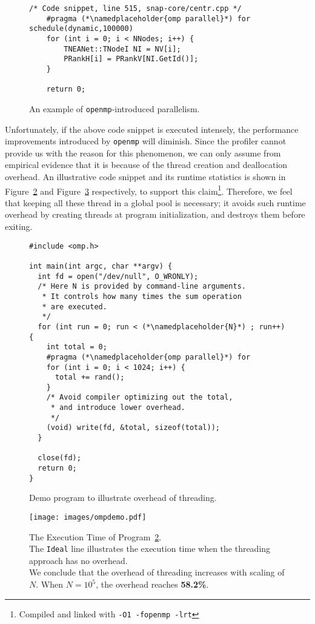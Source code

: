\begin{figure}[ht]
    \centering
\begin{lstlisting}[frame=tlbr]
    /* Code snippet, line 515, snap-core/centr.cpp */
    #pragma (*\namedplaceholder{omp parallel}*) for schedule(dynamic,100000)
    for (int i = 0; i < NNodes; i++) {
        TNEANet::TNodeI NI = NV[i];
        PRankH[i] = PRankV[NI.GetId()];
    }

    return 0;
\end{lstlisting}
    \caption{An example of \texttt{openmp}-introduced parallelism.}
    \label{code:openmp}
\end{figure}

\par Unfortunately, if the above code snippet is executed intensely, the 
performance improvements introduced by \texttt{openmp} will diminish. Since 
the profiler cannot provide us with the reason for this phenomenon, we can
only assume from empirical evidence that it is because of the thread creation 
and deallocation overhead. An illustrative code snippet and its runtime
statistics is shown in Figure~\ref{code:ompdemo} and Figure~\ref{fig:ompdemo} respectively,
to support this claim\footnote{Compiled and linked with \texttt{-O1 -fopenmp -lrt}}.
Therefore, we feel that keeping all these thread in a global pool is necessary;
it avoids such runtime overhead by creating threads at program initialization,
and destroys them before exiting.

\begin{figure}[ht]
    \centering
\begin{lstlisting}[frame=tlbr]
#include <omp.h>

int main(int argc, char **argv) {
  int fd = open("/dev/null", O_WRONLY);
  /* Here N is provided by command-line arguments. 
   * It controls how many times the sum operation
   * are executed.
   */
  for (int run = 0; run < (*\namedplaceholder{N}*) ; run++) {
    int total = 0;
    #pragma (*\namedplaceholder{omp parallel}*) for
    for (int i = 0; i < 1024; i++) {
      total += rand();
    }
    /* Avoid compiler optimizing out the total,
     * and introduce lower overhead.
     */
    (void) write(fd, &total, sizeof(total));
  }

  close(fd);
  return 0;
}
\end{lstlisting}
    \caption{Demo program to illustrate overhead of threading.}
    \label{code:ompdemo}
\end{figure}

\begin{figure}[ht]
    \centering
    \texttt{[image: images/ompdemo.pdf]}
    \caption{The Execution Time of Program~\ref{code:ompdemo}. \\
        The \texttt{Ideal} line illustrates the execution time when the threading
        approach has no overhead. \\
        We conclude that the overhead of threading increases with scaling of $N$.
        When $N = 10^5$, the overhead reaches \textbf{58.2\%}. }
    \label{fig:ompdemo}
\end{figure}


